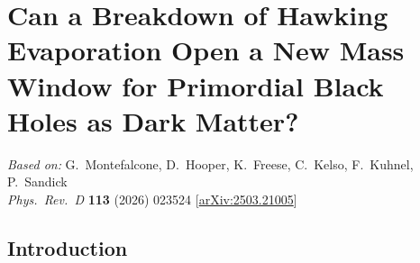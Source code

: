 \chapter[Can a Breakdown of Hawking Evaporation Open a New Mass Window for PBHs as DM?]{Can a Breakdown of Hawking Evaporation Open a New Mass Window for Primordial Black Holes as Dark Matter?}
\label{ch:pbh-memory-burden}

\begin{center}
\textit{Based on:} G.~Montefalcone, D.~Hooper, K.~Freese, C.~Kelso, F.~Kuhnel, P.~Sandick\\
\textit{Phys.\ Rev.\ D} \textbf{113} (2026) 023524
[\href{https://arxiv.org/abs/2503.21005}{arXiv:2503.21005}]
\end{center}
\vspace{1em}

\newcommand{\gsim}{\raisebox{-0.13cm}{~\shortstack{$>$ \\[-0.07cm]
      $\sim$}}~}
\newcommand{\lsim}{\raisebox{-0.13cm}{~\shortstack{$<$ \\[-0.07cm]
      $\sim$}}~}


\section{Introduction}
\label{sec:ch10-intro}

